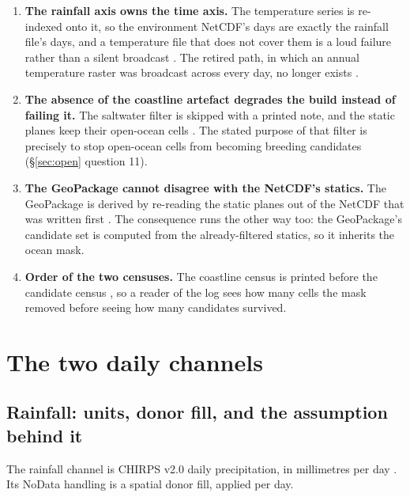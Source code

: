 \documentclass[11pt,a4paper]{article} \usepackage[utf8]{inputenc} \usepackage{lmodern} \usepackage[T1]{fontenc}
\begin{document}
\begin{enumerate}
\item \textbf{The rainfall axis owns the time axis.} The temperature series is re-indexed onto
it, so the environment NetCDF's days are exactly the rainfall file's days, and a temperature
file that does not cover them is a loud failure rather than a silent broadcast
. The retired path, in which an annual
temperature raster was broadcast across every day, no longer exists
. 
\item \textbf{The absence of the
coastline artefact degrades the build instead of failing it.} The saltwater filter is skipped
with a printed note, and the static planes keep their open-ocean cells
. The stated purpose of that filter is
precisely to stop open-ocean cells from becoming breeding candidates
 (\S\ref{sec:open} question 11). 
\item
\textbf{The GeoPackage cannot disagree with the NetCDF's statics.} The GeoPackage is derived by
re-reading the static planes out of the NetCDF that was written first
. The consequence runs the other way too: the
GeoPackage's candidate set is computed from the already-filtered statics, so it inherits the
ocean mask. 
\item \textbf{Order of the two censuses.} The coastline census is printed before the
candidate census , so a reader of the
log sees how many cells the mask removed before seeing how many candidates survived.
\end{enumerate}

\section{The two daily channels} \label{sec:channels}

\subsection{Rainfall: units, donor fill, and the assumption behind it}

The rainfall channel is CHIRPS v2.0 daily precipitation, in millimetres per day
. Its NoData handling is a spatial
donor fill, applied per day.
\end{document}
